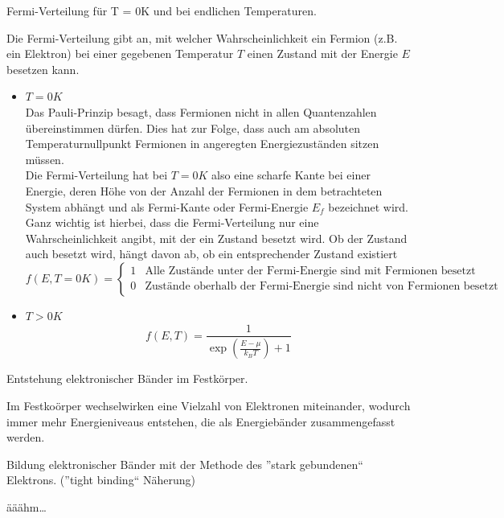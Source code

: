 \documentclass[a5paper,12pt,ngerman,grid=front %
,print
]{kartei}
\begin{document}
	\begin{karte}{
		Fermi-Verteilung für T = 0K und bei endlichen Temperaturen.
		}
		
		Die Fermi-Verteilung gibt an, mit welcher Wahrscheinlichkeit ein Fermion (z.B. ein Elektron) bei einer gegebenen Temperatur $T$ einen Zustand mit der Energie $E$ besetzen kann.
		
		\begin{itemize}
			\item $T=0K$ \\
				Das Pauli-Prinzip besagt, dass Fermionen nicht in allen Quantenzahlen übereinstimmen dürfen. Dies hat zur Folge, dass auch am absoluten Temperaturnullpunkt Fermionen in angeregten Energiezuständen sitzen müssen. \\
				Die Fermi-Verteilung hat bei $T=0K$ also eine scharfe Kante bei einer Energie, deren Höhe von der Anzahl der Fermionen in dem betrachteten System abhängt und als Fermi-Kante oder Fermi-Energie $E_f$ bezeichnet wird. Ganz wichtig ist hierbei, dass die Fermi-Verteilung nur eine Wahrscheinlichkeit angibt, mit der ein Zustand besetzt wird. Ob der Zustand auch besetzt wird, hängt davon ab, ob ein entsprechender Zustand existiert \\
				$$f(E,T=0K)= \begin{cases}
					1 & \mbox{Alle Zustände unter der Fermi-Energie sind mit Fermionen besetzt} \\
					0 & \mbox{Zustände oberhalb der Fermi-Energie sind nicht von Fermionen besetzt}
				\end{cases}$$
			\item $T>0K$ \\
				$$f(E,T) = \frac{ 1 }{  \exp \left( \frac{ E- \mu }{k_B T} \right) + 1   } $$
		\end{itemize}
		
	\end{karte}


	\begin{karte}{
		Entstehung elektronischer Bänder im Festkörper.
		}
		
		Im Festkoörper wechselwirken eine Vielzahl von Elektronen miteinander, wodurch immer mehr Energieniveaus entstehen, die als Energiebänder zusammengefasst werden.
		
	\end{karte}


	\begin{karte}{
		Bildung elektronischer Bänder mit der Methode des ”stark gebundenen“ Elektrons. 
		(”tight binding“ Näherung)
		}
		
		ääähm…
		
	\end{karte}
\end{document}

